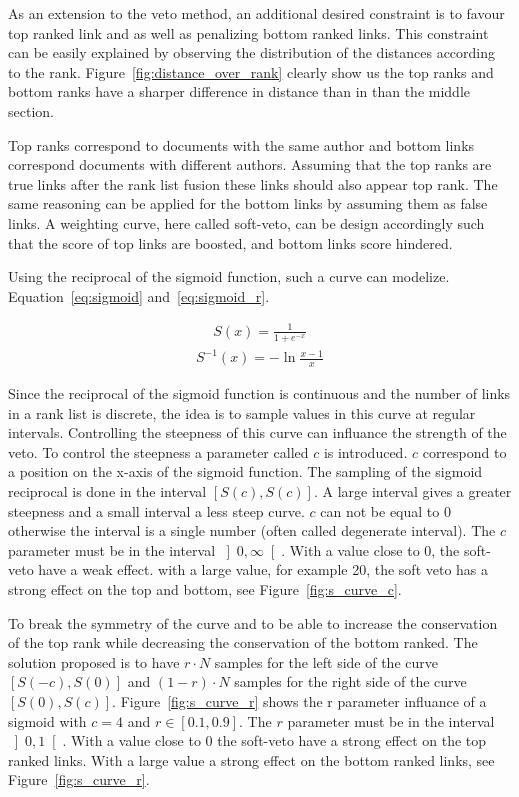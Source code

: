 As an extension to the veto method, an additional desired constraint is to favour top ranked link and as well as penalizing bottom ranked links.
This constraint can be easily explained by observing the distribution of the distances according to the rank.
Figure~\ref{fig:distance_over_rank} clearly show us the top ranks and bottom ranks have a sharper difference in distance than in than the middle section.

Top ranks correspond to documents with the same author and bottom links correspond documents with different authors.
Assuming that the top ranks are true links after the rank list fusion these links should also appear top rank.
The same reasoning can be applied for the bottom links by assuming them as false links.
A weighting curve, here called soft-veto, can be design accordingly such that the score of top links are boosted, and bottom links score hindered.

Using the reciprocal of the sigmoid function, such a curve can modelize.
Equation~\ref{eq:sigmoid} and~\ref{eq:sigmoid_r}.

\begin{gather*}
  \label{eq:sigmoid}
  S(x) = \frac{1}{1+e^{-x}}
\end{gather*}
\begin{gather*}
  \label{eq:sigmoid_r}
  S^{-1}(x) = -\ln{\frac{x-1}{x}}
\end{gather*}

Since the reciprocal of the sigmoid function is continuous and the number of links in a rank list is discrete, the idea is to sample values in this curve at regular intervals.
Controlling the steepness of this curve can influance the strength of the veto.
To control the steepness a parameter called $c$ is introduced.
$c$ correspond to a position on the x-axis of the sigmoid function.
The sampling of the sigmoid reciprocal is done in the interval $\left[S(c), S(c)\right]$.
A large interval gives a greater steepness and a small interval a less steep curve.
$c$ can not be equal to 0 otherwise the interval is a single number (often called degenerate interval).
The $c$ parameter must be in the interval $\left]0, \infty\right[$.
With a value close to $0$, the soft-veto have a weak effect.
with a large value, for example 20, the soft veto has a strong effect on the top and bottom, see Figure~\ref{fig:s_curve_c}.

To break the symmetry of the curve and to be able to increase the conservation of the top rank while decreasing the conservation of the bottom ranked.
The solution proposed is to have $r \cdot N$ samples for the left side of the curve $\left[S(-c), S(0)\right]$
and $(1-r) \cdot N$ samples for the right side of the curve $\left[S(0), S(c)\right]$.
Figure~\ref{fig:s_curve_r} shows the r parameter influance of a sigmoid with $c = 4$ and $r \in \left[0.1, 0.9\right]$.
The $r$ parameter must be in the interval $\left]0, 1\right[$.
With a value close to $0$ the soft-veto have a strong effect on the top ranked links.
With a large value a strong effect on the bottom ranked links, see Figure~\ref{fig:s_curve_r}.


